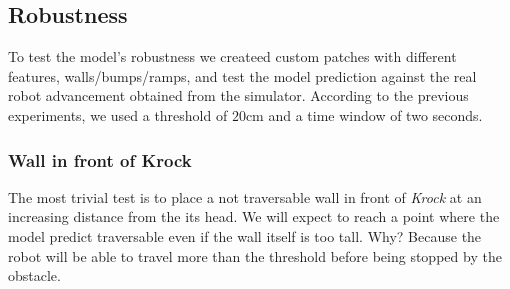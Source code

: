 \documentclass[../document.tex]{subfiles}
\begin{document}
\subsection{Robustness}
To test the model's robustness we createed custom patches with different features, walls/bumps/ramps, and test the model prediction against the real robot advancement obtained from the simulator. According to the previous experiments, we used a threshold of $20$cm and a time window of two seconds. 
\subsubsection{Wall in front of Krock}
The most trivial test is to place a not traversable wall in front of \emph{Krock} at an increasing distance from the its head. We will expect to reach a point where the model predict traversable even if the wall itself is too tall. Why? Because the robot will be able to travel more than the threshold before being stopped by the obstacle.
\end{document}
